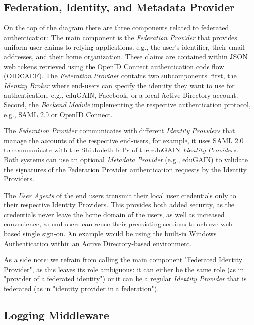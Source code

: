 \documentclass{llncs}
\begin{document}
\subsection{Federation, Identity, and Metadata Provider}

On the top of the diagram there are three components related to federated authentication: The main component is the \textit{Federation Provider} that provides uniform user claims to relying applications, e.g., the user's identifier, their email addresses, and their home organization. These claims are contained within JSON web tokens retrieved using the OpenID Connect authentication code flow (OIDCACF). The \textit{Federation Provider} contains two subcomponents: first, the \textit{Identity Broker} where end-users can specify the identity they want to use for authentication, e.g., eduGAIN, Facebook, or a local Active Directory account. Second, the \textit{Backend Module} implementing the respective authentication protocol, e.g., SAML 2.0 or OpenID Connect.

The \textit{Federation Provider} communicates with different \textit{Identity Providers} that manage the accounts of the respective end-users, for example, it uses SAML 2.0 to communicate with the Shibboleth IdPs of the eduGAIN \textit{Identity Providers}. Both systems can use an optional \textit{Metadata Provider} (e.g., eduGAIN) to validate the signatures of the Federation Provider authentication requests by the Identity Providers.

The \textit{User Agents} of the end users transmit their local user credentials only to their respective Identity Providers. This provides both added security, as the credentials never leave the home domain of the users, as well as increased convenience, as end users can reuse their preexisting sessions to achieve web-based single sign-on. An example would be using the built-in Windows Authentication within an Active Directory-based environment.

As a side note: we refrain from calling the main component "Federated Identity Provider", as this leaves its role ambiguous: it can either be the same role (as in "provider of a federated identity") or it can be a regular \textit{Identity Provider} that is federated (as in "identity provider in a federation").

\subsection{Logging Middleware}
\end{document}
